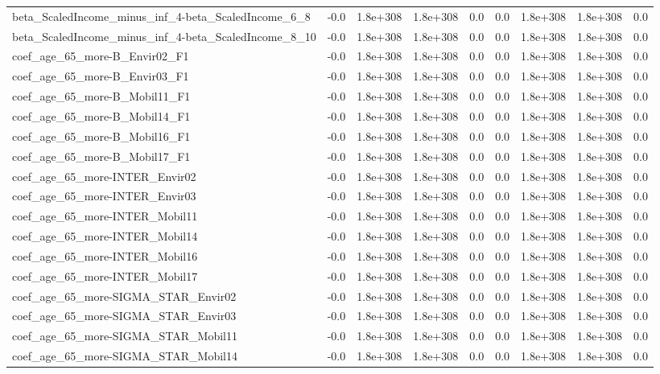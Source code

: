 \begin{tabular}{lrrrrrrrr}
beta_ScaledIncome_minus_inf_4-beta_ScaledIncome_6_8 & -0.0 & 1.8e+308 & 1.8e+308 & 0.0 & 0.0 & 1.8e+308 & 1.8e+308 & 0.0 \\
beta_ScaledIncome_minus_inf_4-beta_ScaledIncome_8_10 & -0.0 & 1.8e+308 & 1.8e+308 & 0.0 & 0.0 & 1.8e+308 & 1.8e+308 & 0.0 \\
coef_age_65_more-B_Envir02_F1 & -0.0 & 1.8e+308 & 1.8e+308 & 0.0 & 0.0 & 1.8e+308 & 1.8e+308 & 0.0 \\
coef_age_65_more-B_Envir03_F1 & -0.0 & 1.8e+308 & 1.8e+308 & 0.0 & 0.0 & 1.8e+308 & 1.8e+308 & 0.0 \\
coef_age_65_more-B_Mobil11_F1 & -0.0 & 1.8e+308 & 1.8e+308 & 0.0 & 0.0 & 1.8e+308 & 1.8e+308 & 0.0 \\
coef_age_65_more-B_Mobil14_F1 & -0.0 & 1.8e+308 & 1.8e+308 & 0.0 & 0.0 & 1.8e+308 & 1.8e+308 & 0.0 \\
coef_age_65_more-B_Mobil16_F1 & -0.0 & 1.8e+308 & 1.8e+308 & 0.0 & 0.0 & 1.8e+308 & 1.8e+308 & 0.0 \\
coef_age_65_more-B_Mobil17_F1 & -0.0 & 1.8e+308 & 1.8e+308 & 0.0 & 0.0 & 1.8e+308 & 1.8e+308 & 0.0 \\
coef_age_65_more-INTER_Envir02 & -0.0 & 1.8e+308 & 1.8e+308 & 0.0 & 0.0 & 1.8e+308 & 1.8e+308 & 0.0 \\
coef_age_65_more-INTER_Envir03 & -0.0 & 1.8e+308 & 1.8e+308 & 0.0 & 0.0 & 1.8e+308 & 1.8e+308 & 0.0 \\
coef_age_65_more-INTER_Mobil11 & -0.0 & 1.8e+308 & 1.8e+308 & 0.0 & 0.0 & 1.8e+308 & 1.8e+308 & 0.0 \\
coef_age_65_more-INTER_Mobil14 & -0.0 & 1.8e+308 & 1.8e+308 & 0.0 & 0.0 & 1.8e+308 & 1.8e+308 & 0.0 \\
coef_age_65_more-INTER_Mobil16 & -0.0 & 1.8e+308 & 1.8e+308 & 0.0 & 0.0 & 1.8e+308 & 1.8e+308 & 0.0 \\
coef_age_65_more-INTER_Mobil17 & -0.0 & 1.8e+308 & 1.8e+308 & 0.0 & 0.0 & 1.8e+308 & 1.8e+308 & 0.0 \\
coef_age_65_more-SIGMA_STAR_Envir02 & -0.0 & 1.8e+308 & 1.8e+308 & 0.0 & 0.0 & 1.8e+308 & 1.8e+308 & 0.0 \\
coef_age_65_more-SIGMA_STAR_Envir03 & -0.0 & 1.8e+308 & 1.8e+308 & 0.0 & 0.0 & 1.8e+308 & 1.8e+308 & 0.0 \\
coef_age_65_more-SIGMA_STAR_Mobil11 & -0.0 & 1.8e+308 & 1.8e+308 & 0.0 & 0.0 & 1.8e+308 & 1.8e+308 & 0.0 \\
coef_age_65_more-SIGMA_STAR_Mobil14 & -0.0 & 1.8e+308 & 1.8e+308 & 0.0 & 0.0 & 1.8e+308 & 1.8e+308 & 0.0 \\

\end{tabular}

